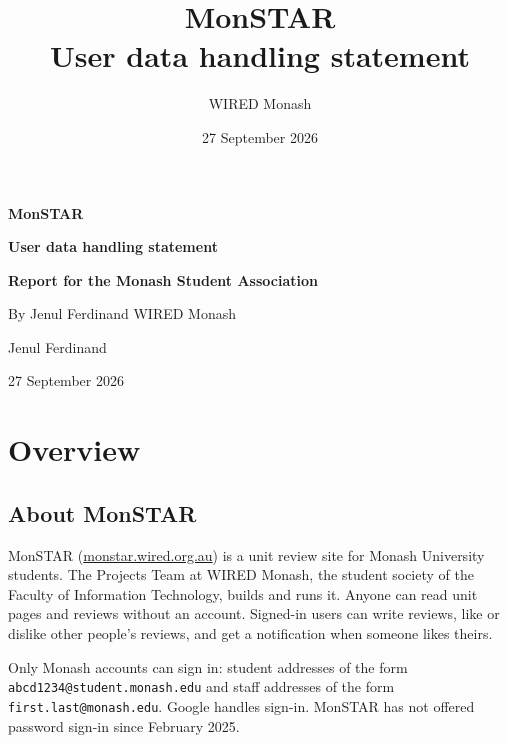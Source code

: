 \documentclass[11pt,a4paper]{article}
\title{MonSTAR\\User data handling statement}
\author{WIRED Monash}
\date{27 September 2026}
\begin{document}
\hypersetup{pageanchor=false}

\begin{titlepage}
  \centering
  \vspace*{5\baselineskip}
  {\huge\bfseries MonSTAR\par}
  {\huge\bfseries User data handling statement\par}
  \vspace{3\baselineskip}
  {\large\bfseries Report for the Monash Student Association\par}
  \vspace{0.3\baselineskip}
  {\small By Jenul Ferdinand \quad WIRED Monash\par}
  \vfill
  {\small Jenul Ferdinand\par}
  \vspace{0.8\baselineskip}
  {\small 27 September 2026\par}
  \vspace*{2\baselineskip}
\end{titlepage}

\clearpage
\hypersetup{pageanchor=true}
\thispagestyle{plain}
\tableofcontents
\clearpage
{}

\section{Overview}

\subsection{About MonSTAR}

MonSTAR (\href{https://monstar.wired.org.au}{monstar.wired.org.au}) is a unit
review site for Monash University students.  The Projects Team at WIRED
Monash, the student society of the Faculty of Information Technology, builds
and runs it.  Anyone can read unit pages and reviews without an account.
Signed-in users can write reviews, like or dislike other people's reviews,
and get a notification when someone likes theirs.

Only Monash accounts can sign in: student addresses of the form
\nolinkurl{abcd1234@student.monash.edu} and staff addresses of the form
\nolinkurl{first.last@monash.edu}.  Google handles sign-in.  MonSTAR has not
offered password sign-in since February 2025.
\end{document}
